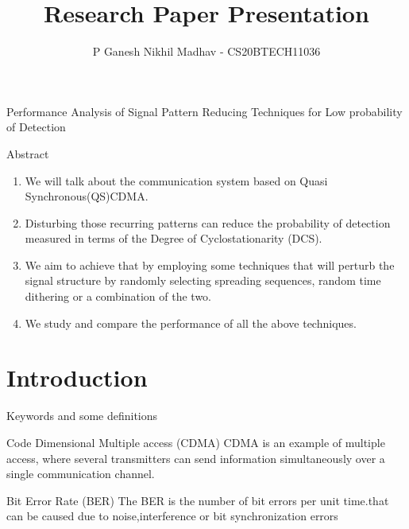 \documentclass{beamer}
\title{Research Paper Presentation}
\author{P Ganesh Nikhil Madhav - CS20BTECH11036}
\begin{document}
\begin{frame}
\titlepage
\end{frame}
\section{}
\begin{frame}{Performance Analysis of Signal Pattern Reducing Techniques for Low probability of Detection }
\begin{block}{Abstract}
\begin{enumerate}
    \item We will talk about the communication system based on Quasi Synchronous(QS)CDMA.
    \item  Disturbing those recurring patterns can reduce the probability of detection measured in terms of the Degree of Cyclostationarity (DCS).
    \item We aim to achieve that by employing some techniques that will perturb the signal structure by randomly selecting spreading sequences, random time dithering or a combination of the two. 
    \item We study and compare the performance of all the above techniques.
\end{enumerate}

\end{block}
\end{frame}
\section{Introduction}
\begin{frame}{Keywords and some definitions}
\begin{block}{ Code Dimensional Multiple access (CDMA)}
     CDMA is an example of multiple access, where several transmitters can send information simultaneously over a single communication channel.
\end{block}
\begin{block}{Bit Error Rate (BER)}
       The BER is the number of bit errors per unit time.that can be caused due to noise,interference or bit synchronization errors
\end{block}
\end{frame}
\end{document}
